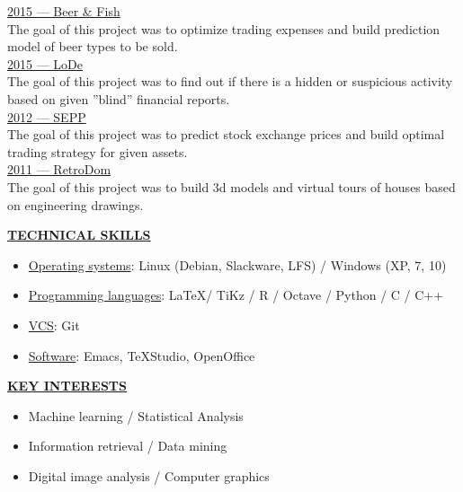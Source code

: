 \documentclass[a4paper,10pt,fullpage]{article}
\begin{document}
\underline{2015 --- Beer \& Fish}\\
The goal of this project was to optimize trading expenses and build prediction model of beer types to be sold.\\

\underline{2015 --- LoDe}\\
The goal of this project was to find out if there is a hidden or suspicious activity  based on given ''blind'' financial reports.\\

\underline{2012 --- SEPP}\\
The goal of this project was to predict stock exchange prices and build optimal trading strategy for 
given assets.\\

\underline{2011 --- RetroDom}\\
The goal of this project was to build 3d models and virtual tours of houses based on engineering 
drawings.\\

\begin{center}
	\underline{\textbf{TECHNICAL SKILLS}}
\end{center}
\begin{itemize}
	\item \underline{Operating systems}: \hspace{1.5cm} Linux (Debian, Slackware, LFS) / Windows (XP, 7, 10)
	\item \underline{Programming languages}: \hspace{0.6cm} \LaTeX / TiKz / R / Octave / Python / C / C++ 
	\item \underline{VCS}: \hspace{3.6cm} Git
	\item \underline{Software}: \hspace{3cm} Emacs, \TeX Studio, OpenOffice\\
\end{itemize}

\begin{center}
	\underline{\textbf{KEY INTERESTS}}
\end{center}
\begin{itemize}
	\item Machine learning / Statistical Analysis
	\item Information retrieval / Data mining
	\item Digital image analysis / Computer graphics\\
\end{itemize}
\end{document}
